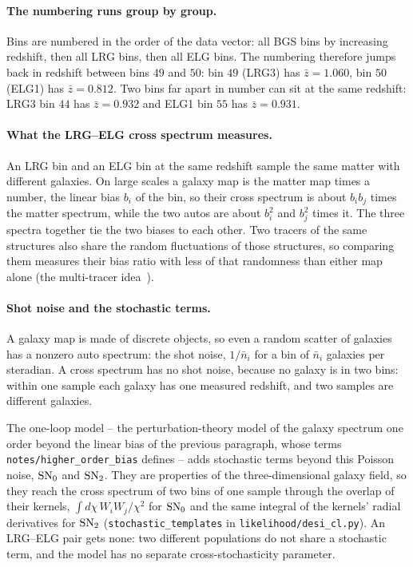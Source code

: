 \documentclass[11pt]{article}
\newcommand{\us}{\_\allowbreak}
\begin{document}
\paragraph{The numbering runs group by group.}
Bins are numbered in the order of the data vector: all BGS bins by
increasing redshift, then all LRG bins, then all ELG bins.  The
numbering therefore jumps back in redshift between bins $49$ and $50$:
bin $49$ (LRG3) has $\bar{z} = 1.060$, bin $50$ (ELG1) has
$\bar{z} = 0.812$.  Two bins far apart in number can sit at the same
redshift: LRG3 bin $44$ has $\bar{z} = 0.932$ and ELG1 bin $55$ has
$\bar{z} = 0.931$.

\paragraph{What the LRG--ELG cross spectrum measures.}
An LRG bin and an ELG bin at the same redshift sample the same matter
with different galaxies.  On large scales a galaxy map is the matter map
times a number, the linear bias $b_i$ of the bin, so their cross
spectrum is about $b_i b_j$ times the matter spectrum, while the two
autos are about $b_i^2$ and $b_j^2$ times it.  The three spectra
together tie the two biases to each other.  Two tracers of the same
structures also share the random fluctuations of those structures, so
comparing them measures their bias ratio with less of that randomness
than either map alone (the multi-tracer idea~\cite{Seljak2009}).

\paragraph{Shot noise and the stochastic terms.}
A galaxy map is made of discrete objects, so even a random scatter of
galaxies has a nonzero auto spectrum: the shot noise, $1/\bar{n}_i$
for a bin of $\bar{n}_i$ galaxies per steradian.  A cross spectrum
has no shot noise, because no galaxy is in two bins: within one
sample each galaxy has one measured redshift, and two samples are
different galaxies.

The one-loop model -- the perturbation-theory model of the galaxy
spectrum one order beyond the linear bias of the previous paragraph,
whose terms \texttt{notes/higher\us order\us bias} defines -- adds
stochastic terms beyond this Poisson noise,
${\rm SN}_0$ and ${\rm SN}_2$.  They are properties of the
three-dimensional galaxy field, so they reach the cross spectrum of two
bins of one sample through the overlap of their kernels, $\int d\chi\,
W_i W_j/\chi^2$ for ${\rm SN}_0$ and the same integral of the kernels'
radial derivatives for ${\rm SN}_2$ (\texttt{stochastic\us templates} in
\texttt{likelihood/desi\us cl.py}).  An LRG--ELG pair gets none: two
different populations do not share a stochastic term, and the model has
no separate cross-stochasticity parameter.
\end{document}
